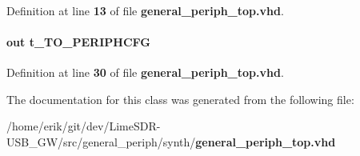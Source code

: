 \paragraph[{std\+\_\+logic\+\_\+1164}]{\hspace{0.3cm}{\ttfamily [Package]}}\label{classgeneral__periph__top_acd03516902501cd1c7296a98e22c6fcb}


Definition at line {\bf 13} of file {\bf general\+\_\+periph\+\_\+top.\+vhd}.

\paragraph[{to\+\_\+periphcfg}]{ {\bfseries \textcolor{keywordflow}{out}\textcolor{vhdlchar}{ }} {\bfseries {\bfseries {\bf t\+\_\+\+T\+O\+\_\+\+P\+E\+R\+I\+P\+H\+C\+FG}} \textcolor{vhdlchar}{ }} \hspace{0.3cm}{\ttfamily [Port]}}\label{classgeneral__periph__top_a1d918accd653013fe780d8028514b4f1}


Definition at line {\bf 30} of file {\bf general\+\_\+periph\+\_\+top.\+vhd}.



The documentation for this class was generated from the following file\+:\begin{DoxyCompactItemize}
\item 
/home/erik/git/dev/\+Lime\+S\+D\+R-\/\+U\+S\+B\+\_\+\+G\+W/src/general\+\_\+periph/synth/{\bf general\+\_\+periph\+\_\+top.\+vhd}\end{DoxyCompactItemize}
